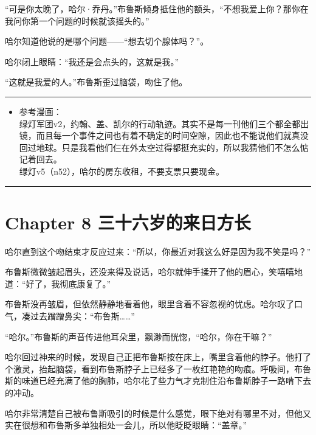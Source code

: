 \documentclass[../main]{subfiles}
\begin{document}
“可是你太晚了，哈尔·乔丹。”布鲁斯倾身抵住他的额头，“不想我爱上你？那你在我问你第一个问题的时候就该摇头的。”

哈尔知道他说的是哪个问题——“想去切个腺体吗？”。

哈尔闭上眼睛：“我还是会点头的，这就是我。”

“这就是我爱的人。”布鲁斯歪过脑袋，吻住了他。

\begin{center}\rule{0.5\linewidth}{0.5pt}\end{center}

\begin{itemize}
    \item
          参考漫画：\\
          绿灯军团v2，约翰、盖、凯尔的行动轨迹。其实不是每一刊他们三个都全都出镜，而且每一个事件之间也有着不确定的时间空隙，因此也不能说他们就真没回过地球。只是我看他们仨在外太空过得都挺充实的，所以我猜他们不怎么惦记着回去。\\
          绿灯v5（n52），哈尔的房东收租，不要支票只要现金。
\end{itemize}

\begin{center}\rule{0.5\linewidth}{0.5pt}\end{center}

\hypertarget{chapter-8-ux4e09ux5341ux516dux5c81ux7684ux6765ux65e5ux65b9ux957f}{%
    \section{Chapter 8
      三十六岁的来日方长}\label{chapter-8-ux4e09ux5341ux516dux5c81ux7684ux6765ux65e5ux65b9ux957f}}

哈尔直到这个吻结束才反应过来：“所以，你最近对我这么好是因为我不笑是吗？”

布鲁斯微微皱起眉头，还没来得及说话，哈尔就伸手揉开了他的眉心，笑嘻嘻地道：“好了，我彻底康复了。”

布鲁斯没再皱眉，但依然静静地看着他，眼里含着不容忽视的忧虑。哈尔叹了口气，凑过去蹭蹭鼻尖：“布鲁斯\ldots\ldots”

“哈尔。”布鲁斯的声音传进他耳朵里，飘渺而恍惚，“哈尔，你在干嘛？”

哈尔回过神来的时候，发现自己正把布鲁斯按在床上，嘴里含着他的脖子。他打了个激灵，抬起脑袋，看到布鲁斯脖子上已经多了一枚红艳艳的吻痕。呼吸间，布鲁斯的味道已经充满了他的胸肺，哈尔花了些力气才克制住沿布鲁斯脖子一路啃下去的冲动。

哈尔非常清楚自己被布鲁斯吸引的时候是什么感觉，眼下绝对有哪里不对，但他又实在很想和布鲁斯多单独相处一会儿，所以他眨眨眼睛：“盖章。”
\end{document}
